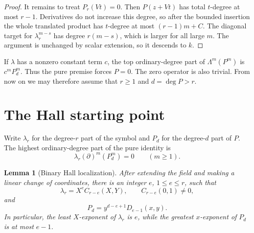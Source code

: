 \documentclass[11pt]{article}
\newtheorem{lemma}[theorem]{Lemma}
\begin{document}
\begin{proof}
It remains to treat $P_r(Vt)=0$.  Then $P(z+Vt)$ has total $t$-degree at
most $r-1$.
Derivatives do not increase this degree, so after the bounded insertion the
whole translated product has $t$-degree at most $(r-1)m+C$.  The diagonal
target for $\lambda_r^{m-s}$ has degree $r(m-s)$, which is larger for all
large $m$.  The argument is unchanged by scalar extension, so it descends
to $k$.
\end{proof}

If $\lambda$ has a nonzero constant term $c$, the top ordinary-degree part
of $\Lambda^m(P^m)$ is $c^mP_d^m$.  Thus the pure premise forces $P=0$.
The zero operator is also trivial.  From now on we may therefore assume
that $r\geq1$ and $d=\deg P>r$.

\section{The Hall starting point}

Write $\lambda_r$ for the degree-$r$ part of the symbol and $P_d$ for the
degree-$d$ part of $P$.  The highest ordinary-degree part of the pure
identity is
\begin{equation}\label{eq:top-pure}
 \lambda_r(\partial)^m(P_d^m)=0\qquad(m\geq1).
\end{equation}

\begin{lemma}[Binary Hall localization]\label{lem:hall}
After extending the field and making a linear change of coordinates, there
is an integer $e$, $1\leq e\leq r$, such that
\begin{equation}\label{eq:hall-normal}
 \lambda_r=X^eC_{r-e}(X,Y),\qquad C_{r-e}(0,1)\ne0,
\end{equation}
and
\begin{equation}\label{eq:hall-poly}
 P_d=y^{d-e+1}D_{e-1}(x,y).
\end{equation}
In particular, the least $X$-exponent of $\lambda_r$ is $e$, while the
greatest $x$-exponent of $P_d$ is at most $e-1$.
\end{lemma}
\end{document}
